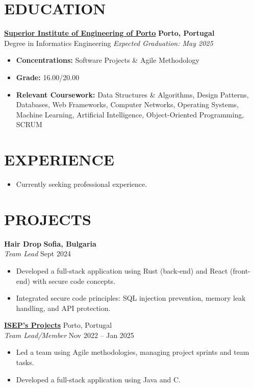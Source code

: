 \documentclass[10pt, letterpaper]{article}
\newenvironment{highlights}{
    \begin{itemize}[
        topsep=0.10 cm,
        parsep=0.10 cm,
        partopsep=0pt,
        itemsep=0pt,
        leftmargin=1cm %
    ]
}{
    \end{itemize}
}
\newenvironment{subhighlights}{
    \begin{itemize}[
        topsep=0.10 cm,
        parsep=0.10 cm,
        partopsep=0pt,
        itemsep=0pt,
        leftmargin=1.5cm, %
        label=$\vcenter{\hbox{\scriptsize$\circ$}}$ %
    ]
}{
    \end{itemize}
}
\begin{document}
\section{EDUCATION}
\textbf{\href{https://www.isep.ipp.pt}{Superior Institute of Engineering of Porto}} \hfill \textbf{Porto, Portugal} \\
Degree in Informatics Engineering \hfill \textit{Expected Graduation: May 2025} \\
\begin{subhighlights}
    \item \textbf{Concentrations:} Software Projects \& Agile Methodology
    \item \textbf{Grade:} 16.00/20.00
    \item \textbf{Relevant Coursework:} Data Structures \& Algorithms, Design Patterns, Databases, Web Frameworks, 
    Computer Networks, Operating Systems, Machine Learning, Artificial Intelligence, Object-Oriented Programming, SCRUM
\end{subhighlights}

\section{EXPERIENCE}
\begin{highlights}
    \item Currently seeking professional experience.
\end{highlights}
\section{PROJECTS}
\textbf{Hair Drop} \hfill \textbf{Sofia, Bulgaria} \\
\textit{Team Lead} \hfill Sept 2024 \\
\begin{highlights}
    \item Developed a full-stack application using Rust (back-end) and React (front-end) with secure code concepts.
    \item Integrated secure code principles: SQL injection prevention, memory leak handling, and API protection.
\end{highlights}

\textbf{\href{https://purenimble.github.io/projects}{ISEP’s Projects}} \hfill Porto, Portugal \\
\textit{Team Lead/Member} \hfill Nov 2022 – Jan 2025 \\
\begin{highlights}
    \item Led a team using Agile methodologies, managing project sprints and team tasks.
    \item Developed a full-stack application using Java and C.
\end{highlights}
\end{document}
